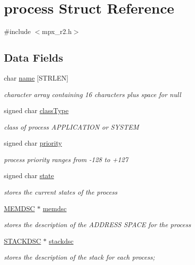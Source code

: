 \hypertarget{structprocess}{
\section{process Struct Reference}
\label{structprocess}
}


{\ttfamily \#include $<$mpx\_\-r2.h$>$}

\subsection*{Data Fields}
\begin{DoxyCompactItemize}
\item 
char \hyperlink{structprocess_ab6613e7bde642a754f71b9f60053cd1a}{name} \mbox{[}STRLEN\mbox{]}
\begin{DoxyCompactList}\small\item\em character array containing 16 characters plus space for null \item\end{DoxyCompactList}\item 
signed char \hyperlink{structprocess_abe608249826d4a0f04fba4398f967047}{classType}
\begin{DoxyCompactList}\small\item\em class of process APPLICATION or SYSTEM \item\end{DoxyCompactList}\item 
signed char \hyperlink{structprocess_a788405fd9aeccd863516f34d3ce1c41e}{priority}
\begin{DoxyCompactList}\small\item\em process priority ranges from -\/128 to +127 \item\end{DoxyCompactList}\item 
signed char \hyperlink{structprocess_af8bb04355feac474fa959e3db52618c9}{state}
\begin{DoxyCompactList}\small\item\em stores the current states of the process \item\end{DoxyCompactList}\item 
\hyperlink{structmem}{MEMDSC} $\ast$ \hyperlink{structprocess_a163551ab7b60184b48e5d440fcd5c2b8}{memdsc}
\begin{DoxyCompactList}\small\item\em stores the description of the ADDRESS SPACE for the process \item\end{DoxyCompactList}\item 
\hyperlink{structstack}{STACKDSC} $\ast$ \hyperlink{structprocess_a7e0fb37fbb9c155b18f75a94a8fc202b}{stackdsc}
\begin{DoxyCompactList}\small\item\em stores the description of the stack for each process; \item\end{DoxyCompactList}\end{DoxyCompactItemize}


